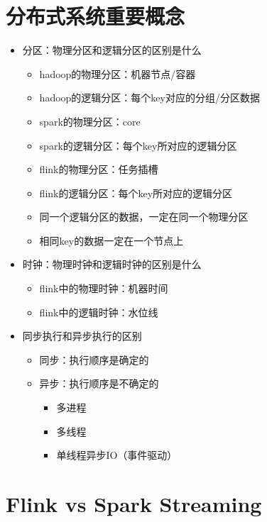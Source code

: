 \documentclass[cn,11pt,chinese]{elegantbook}
\begin{document}
\section{分布式系统重要概念}

\begin{itemize}
  \item 分区：物理分区和逻辑分区的区别是什么
    \begin{itemize}
      \item hadoop的物理分区：机器节点/容器
      \item hadoop的逻辑分区：每个key对应的分组/分区数据
      \item spark的物理分区：core
      \item spark的逻辑分区：每个key所对应的逻辑分区
      \item flink的物理分区：任务插槽
      \item flink的逻辑分区：每个key所对应的逻辑分区
      \item 同一个逻辑分区的数据，一定在同一个物理分区
      \item 相同key的数据一定在一个节点上
    \end{itemize}
  \item 时钟：物理时钟和逻辑时钟的区别是什么
    \begin{itemize}
      \item flink中的物理时钟：机器时间
      \item flink中的逻辑时钟：水位线
    \end{itemize}
  \item 同步执行和异步执行的区别
    \begin{itemize}
      \item 同步：执行顺序是确定的
      \item 异步：执行顺序是不确定的
        \begin{itemize}
          \item 多进程
          \item 多线程
          \item 单线程异步IO（事件驱动）
        \end{itemize}
    \end{itemize}
\end{itemize}

\section{Flink vs Spark Streaming}
\end{document}
